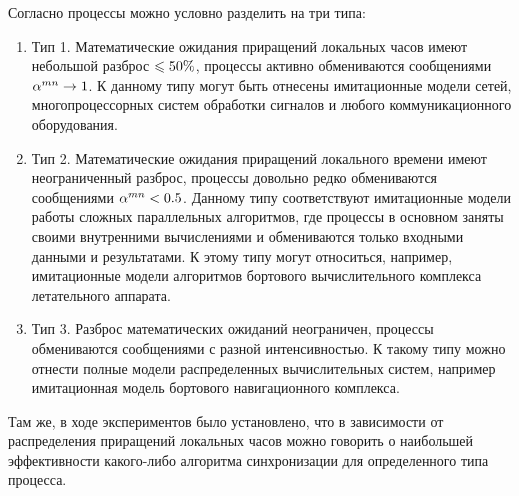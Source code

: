 Согласно \cite{voz-disser} процессы можно условно разделить на три типа: 
\begin{enumerate}
  \item Тип 1. Математические ожидания приращений локальных часов имеют небольшой разброс \hbox{$\leqslant \hss 50\%$}, процессы активно обмениваются сообщениями \hbox{$\alpha^{mn} \hss \rightarrow \hss 1$}. К данному типу могут быть отнесены имитационные модели сетей, многопроцессорных систем обработки сигналов и любого коммуникационного оборудования.
  \item Тип 2. Математические ожидания приращений локального времени имеют неограниченный разброс, процессы довольно редко обмениваются сообщениями \hbox{$\alpha^{mn} \hss < \hss 0.5$}. Данному типу соответствуют имитационные модели работы сложных параллельных алгоритмов, где процессы в основном заняты своими внутренними вычислениями и обмениваются только входными данными и результатами. К этому типу могут относиться, например, имитационные модели алгоритмов бортового вычислительного комплекса летательного аппарата.
  \item Тип 3. Разброс математических ожиданий неограничен, процессы обмениваются сообщениями с разной интенсивностью. К такому типу можно отнести полные модели распределенных вычислительных систем, например имитационная модель бортового навигационного комплекса.
\end{enumerate}

Там же, в ходе экспериментов было установлено, что в зависимости от распределения приращений локальных часов можно говорить о наибольшей эффективности какого-либо алгоритма синхронизации для определенного типа процесса.

